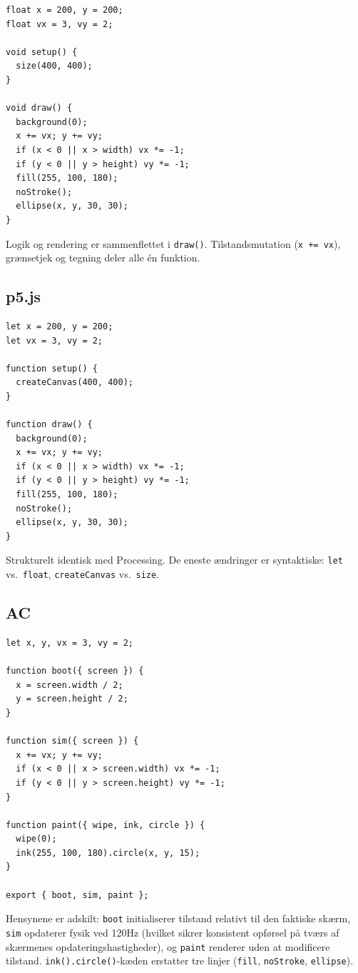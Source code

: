 \documentclass[10pt,letterpaper,twocolumn]{article}
\begin{document}
\begin{lstlisting}[style=processingstyle]
float x = 200, y = 200;
float vx = 3, vy = 2;

void setup() {
  size(400, 400);
}

void draw() {
  background(0);
  x += vx; y += vy;
  if (x < 0 || x > width) vx *= -1;
  if (y < 0 || y > height) vy *= -1;
  fill(255, 100, 180);
  noStroke();
  ellipse(x, y, 30, 30);
}
\end{lstlisting}

Logik og rendering er sammenflettet i \texttt{draw()}. Tilstandsmutation (\texttt{x += vx}), grænsetjek og tegning deler alle én funktion.

\subsection{p5.js}

\begin{lstlisting}[style=p5style]
let x = 200, y = 200;
let vx = 3, vy = 2;

function setup() {
  createCanvas(400, 400);
}

function draw() {
  background(0);
  x += vx; y += vy;
  if (x < 0 || x > width) vx *= -1;
  if (y < 0 || y > height) vy *= -1;
  fill(255, 100, 180);
  noStroke();
  ellipse(x, y, 30, 30);
}
\end{lstlisting}

Strukturelt identisk med Processing. De eneste ændringer er syntaktiske: \texttt{let} vs.\ \texttt{float}, \texttt{createCanvas} vs.\ \texttt{size}.

\subsection{AC}

\begin{lstlisting}[style=acjsstyle]
let x, y, vx = 3, vy = 2;

function boot({ screen }) {
  x = screen.width / 2;
  y = screen.height / 2;
}

function sim({ screen }) {
  x += vx; y += vy;
  if (x < 0 || x > screen.width) vx *= -1;
  if (y < 0 || y > screen.height) vy *= -1;
}

function paint({ wipe, ink, circle }) {
  wipe(0);
  ink(255, 100, 180).circle(x, y, 15);
}

export { boot, sim, paint };
\end{lstlisting}

Hensynene er adskilt: \texttt{boot} initialiserer tilstand relativt til den faktiske skærm, \texttt{sim} opdaterer fysik ved 120Hz (hvilket sikrer konsistent opførsel på tværs af skærmenes opdateringshastigheder), og \texttt{paint} renderer uden at modificere tilstand. \texttt{ink().circle()}-kæden erstatter tre linjer (\texttt{fill}, \texttt{noStroke}, \texttt{ellipse}).
\end{document}
